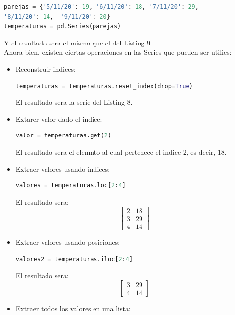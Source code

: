 \documentclass{article}
\begin{document}
\begin{lstlisting}[language=Python, caption= Creacion de una Serie con diccionarios]
parejas = {'5/11/20': 19, '6/11/20': 18, '7/11/20': 29,
'8/11/20': 14,  '9/11/20': 20}
temperaturas = pd.Series(parejas)
\end{lstlisting}
Y el resultado sera el mismo que el del Listing 9.\\
Ahora bien, existen ciertas operaciones en las Series que pueden ser utilies:
\begin{itemize}
    \item Reconstruir indices:
        \begin{lstlisting}[language=Python, caption= Reconstruccion de indices]
            temperaturas = temperaturas.reset_index(drop=True)
        \end{lstlisting}
        El resultado sera la serie del Listing 8.
    \item Extarer valor dado el indice: 
        \begin{lstlisting}[language=Python, caption= Extraer valor de un indice]
            valor = temperaturas.get(2)
        \end{lstlisting}
        El resultado sera el elemnto al cual pertenece el indice 2, es decir, 18.
    \item Extraer valores usando indices:
        \begin{lstlisting}[language=Python, caption= Extraer valores de indices]
            valores = temperaturas.loc[2:4]
        \end{lstlisting}
        El resultado sera:
        \[
        \begin{bmatrix}
            2 & 18\\
            3 & 29\\
            4 & 14
        \end{bmatrix}
        \]
    \item Extraer valores usando posiciones:
        \begin{lstlisting}[language=Python, caption= Extraer valores de posiciones]
            valores2 = temperaturas.iloc[2:4]
        \end{lstlisting}
        El resultado sera:
        \[
        \begin{bmatrix}
            3 & 29\\
            4 & 14
        \end{bmatrix}
        \]
    \item Extraer todos los valores en una lista:
        \begin{lstlisting}[language=Python, caption= Extraer todos los valores]

\end{lstlisting}
\end{itemize}
\end{document}
